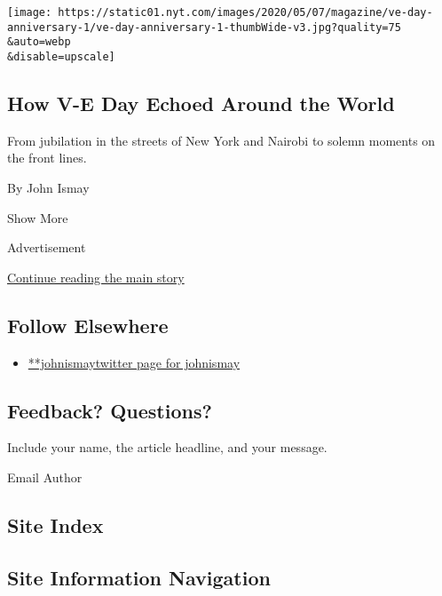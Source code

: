 \begin{enumerate}
  \texttt{[image: https://static01.nyt.com/images/2020/05/07/magazine/ve-day-anniversary-1/ve-day-anniversary-1-thumbWide-v3.jpg?quality=75\\\&auto=webp\\\&disable=upscale]}

  \hypertarget{how-v-e-day-echoed-around-the-world}{%
  \subsection{How V-E Day Echoed Around the
  World}\label{how-v-e-day-echoed-around-the-world}}

  From jubilation in the streets of New York and Nairobi to solemn
  moments on the front lines.

  By John Ismay
\end{enumerate}

Show More

Advertisement

\protect\hyperlink{after-mid2}{Continue reading the main story}

\hypertarget{follow-elsewhere}{%
\subsection{Follow Elsewhere}\label{follow-elsewhere}}

\begin{itemize}
\tightlist
\item
  \href{https://twitter.com/johnismay}{**johnismaytwitter page for
  johnismay}
\end{itemize}

\hypertarget{feedback-questions}{%
\subsection{Feedback? Questions?}\label{feedback-questions}}

Include your name, the article headline, and your message.

Email Author

\hypertarget{site-index}{%
\subsection{Site Index}\label{site-index}}

\hypertarget{site-information-navigation}{%
\subsection{Site Information
Navigation}\label{site-information-navigation}}

